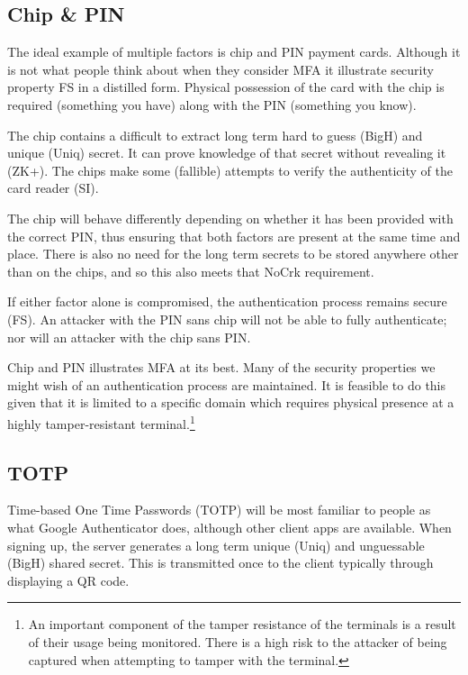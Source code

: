 \documentclass{soups}
\newcommand{\prop}[1]{\textsf{#1}}
\begin{document}
\subsection{Chip \& PIN}

The ideal example of multiple factors is chip and PIN payment cards. Although it is not what people think about when they consider MFA it illustrate security property \prop{FS} in a distilled form.
Physical possession of the card with the chip is required (something you have) along with the PIN (something you know).

The chip contains a difficult to extract long term hard to guess (\prop{BigH}) and unique (\prop{Uniq}) secret. It can prove knowledge of that secret without revealing it (\prop{ZK+}). The chips make some (fallible) attempts to verify the authenticity of the card reader (\prop{SI}).

The chip will behave differently depending on whether it has been provided with the correct PIN, thus ensuring that both factors are present at the same time and place. There is also no need for the long term secrets to be stored anywhere other than on the chips, and so this also meets that \prop{NoCrk} requirement.

If either factor alone is compromised, the authentication process remains secure (\prop{FS}).
An attacker with the PIN sans chip will not be able to fully authenticate; nor will an attacker with the chip sans PIN\@.


Chip and PIN illustrates MFA at its best. Many of the security properties we might wish of an authentication process are maintained. It is feasible to do this given that it is limited to a specific domain which requires physical presence at a highly tamper-resistant terminal.\footnote{An important component of the tamper resistance of the terminals is a result of their usage being monitored. There is a high risk to the attacker of being captured when attempting to tamper with the terminal.}

\subsection{TOTP}\label{sec:totp}

Time-based One Time Passwords (TOTP) will be most familiar to people as what Google Authenticator does, although other client apps are available.
When signing up, the server generates a long term unique (\prop{Uniq}) and unguessable (\prop{BigH}) shared secret. This is transmitted once to the client typically through displaying a QR code. 
\end{document}
